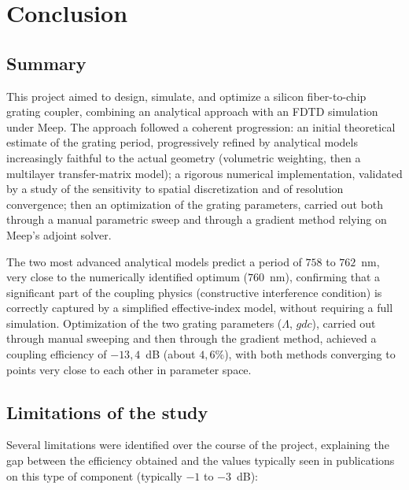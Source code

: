 \documentclass[a4paper,11pt]{report}
\begin{document}
\chapter{Conclusion}

\section{Summary}

This project aimed to design, simulate, and optimize a silicon fiber-to-chip grating coupler, combining an analytical approach with an FDTD simulation under Meep. The approach followed a coherent progression: an initial theoretical estimate of the grating period, progressively refined by analytical models increasingly faithful to the actual geometry (volumetric weighting, then a multilayer transfer-matrix model); a rigorous numerical implementation, validated by a study of the sensitivity to spatial discretization and of resolution convergence; then an optimization of the grating parameters, carried out both through a manual parametric sweep and through a gradient method relying on Meep's adjoint solver.

The two most advanced analytical models predict a period of $758$ to $762$~nm, very close to the numerically identified optimum ($760$~nm), confirming that a significant part of the coupling physics (constructive interference condition) is correctly captured by a simplified effective-index model, without requiring a full simulation. Optimization of the two grating parameters ($\Lambda$, $gdc$), carried out through manual sweeping and then through the gradient method, achieved a coupling efficiency of $-13{,}4$~dB (about $4{,}6\%$), with both methods converging to points very close to each other in parameter space.

\section{Limitations of the study}

Several limitations were identified over the course of the project, explaining the gap between the efficiency obtained and the values typically seen in publications on this type of component (typically $-1$ to $-3$~dB):
\end{document}
